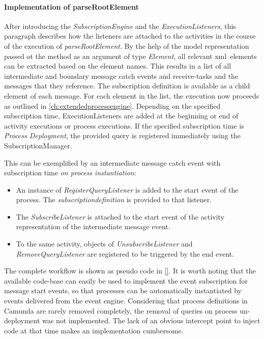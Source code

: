 \paragraph{Implementation of parseRootElement}
After introducing the \textit{SubscriptionEngine} and the \textit{ExecutionListeners}, this paragraph describes how the listeners are attached to the activities in the course of the execution of \textit{parseRootElement}.
By the help of the model representation passed ot the method as an argument of type \textit{Element}, all relevant xml~elements can be extracted based on the element names.
This results in a list of all intermediate and boundary message catch events and receive-tasks and the messages that they reference. The subscription definition is available as a child element of each message.
For each element in the list, the execution now proceeds as outlined in \autoref{ch:extendedprocessengine}.
Depending on the specified subscription time, ExecutionListeners are added at the beginning or end of activity executions or process executions. If the specified subscription time is \textit{Process Deployment}, the provided query is registered immediately using the SubscriptionManager.

This can be exemplified by an intermediate message catch event with subscription time \textit{on process instantiation}:
\begin{itemize}
	\item An instance of \textit{RegisterQueryListener} is added to the start event of the process. The \textit{subscriptiondefinition} is provided to that listener.
	\item The \textit{SubscribeListener} is attached to the start event of the activity representation of the intermediate message event.
	\item To the same activity, objects of \textit{UnsubscribeListener} and \textit{RemoveQueryListener} are registered to be triggered by the end event.
\end{itemize}

The complete workflow is shown as pseudo code in \autoref{}. 
It is worth noting that the available code-base can easily be used to implement the event subscription for message start events, so that processes can be automatically instantiated by events delivered from the event engine.
Considering that process definitions in Camunda are rarely removed completely, the removal of queries on process un-deployment was not implemented. The lack of an obvious intercept point to inject code at that time makes an implementation cumbersome.

